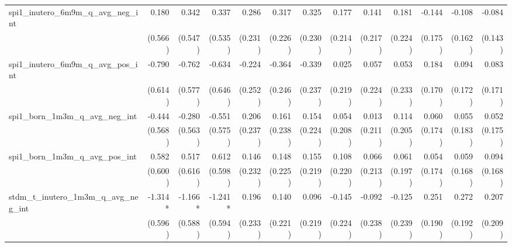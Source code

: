 \begin{tabular}{lrrrrrrrrrrrr}
spi1\_inutero\_6m9m\_q\_avg\_neg\_int       &        0.180 &        0.342 &        0.337 &        0.286 &        0.317 &        0.325 &        0.177 &        0.141 &        0.181 &       -0.144 &       -0.108 &       -0.084 \\ 
                                            &      (0.566) &      (0.547) &      (0.535) &      (0.231) &      (0.226) &      (0.230) &      (0.214) &      (0.217) &      (0.224) &      (0.175) &      (0.162) &      (0.143) \\ 
spi1\_inutero\_6m9m\_q\_avg\_pos\_int       &       -0.790 &       -0.762 &       -0.634 &       -0.224 &       -0.364 &       -0.339 &        0.025 &        0.057 &        0.053 &        0.184 &        0.094 &        0.083 \\ 
                                            &      (0.614) &      (0.577) &      (0.646) &      (0.252) &      (0.246) &      (0.237) &      (0.219) &      (0.224) &      (0.233) &      (0.170) &      (0.172) &      (0.171) \\ 
spi1\_born\_1m3m\_q\_avg\_neg\_int          &       -0.444 &       -0.280 &       -0.551 &        0.206 &        0.161 &        0.154 &        0.054 &        0.013 &        0.114 &        0.060 &        0.055 &        0.052 \\ 
                                            &      (0.568) &      (0.563) &      (0.575) &      (0.237) &      (0.238) &      (0.224) &      (0.208) &      (0.211) &      (0.205) &      (0.174) &      (0.183) &      (0.175) \\ 
spi1\_born\_1m3m\_q\_avg\_pos\_int          &        0.582 &        0.517 &        0.612 &        0.146 &        0.148 &        0.155 &        0.108 &        0.066 &        0.061 &        0.054 &        0.059 &        0.094 \\ 
                                            &      (0.600) &      (0.616) &      (0.598) &      (0.232) &      (0.225) &      (0.219) &      (0.220) &      (0.213) &      (0.197) &      (0.174) &      (0.168) &      (0.168) \\ 
stdm\_t\_inutero\_1m3m\_q\_avg\_neg\_int    &      -1.314* &      -1.166* &      -1.241* &        0.196 &        0.140 &        0.096 &       -0.145 &       -0.092 &       -0.125 &        0.251 &        0.272 &        0.207 \\ 
                                            &      (0.596) &      (0.588) &      (0.594) &      (0.233) &      (0.221) &      (0.219) &      (0.224) &      (0.238) &      (0.239) &      (0.190) &      (0.192) &      (0.209) \\ 

\end{tabular}
